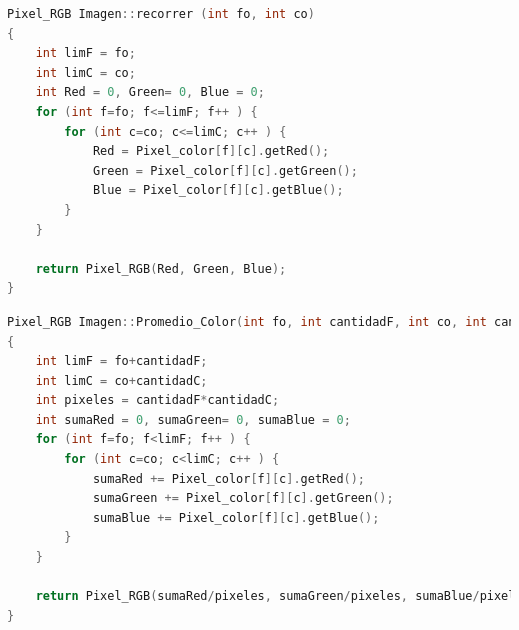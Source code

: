 \documentclass{article}
\begin{document}
\newpage
\begin{lstlisting}[language=C++, caption=Clase recorrer]
Pixel_RGB Imagen::recorrer (int fo, int co)
{
    int limF = fo;
    int limC = co;
    int Red = 0, Green= 0, Blue = 0;
    for (int f=fo; f<=limF; f++ ) {
        for (int c=co; c<=limC; c++ ) {
            Red = Pixel_color[f][c].getRed();
            Green = Pixel_color[f][c].getGreen();
            Blue = Pixel_color[f][c].getBlue();
        }
    }

    return Pixel_RGB(Red, Green, Blue);
}
\end{lstlisting}
\vspace{1,5cm}
\begin{lstlisting}[language=C++, caption=Clase promedio color]
Pixel_RGB Imagen::Promedio_Color(int fo, int cantidadF, int co, int cantidadC)
{
    int limF = fo+cantidadF;
    int limC = co+cantidadC;
    int pixeles = cantidadF*cantidadC;
    int sumaRed = 0, sumaGreen= 0, sumaBlue = 0;
    for (int f=fo; f<limF; f++ ) {
        for (int c=co; c<limC; c++ ) {
            sumaRed += Pixel_color[f][c].getRed();
            sumaGreen += Pixel_color[f][c].getGreen();
            sumaBlue += Pixel_color[f][c].getBlue();
        }
    }

    return Pixel_RGB(sumaRed/pixeles, sumaGreen/pixeles, sumaBlue/pixeles);
}
\end{lstlisting}
\vspace{1,5cm}
\end{document}
